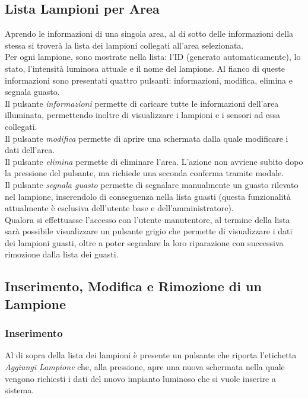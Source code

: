 \documentclass[a4paper, 12pt]{article}
\begin{document}
\subsection{Lista Lampioni per Area}
Aprendo le informazioni di una singola area, al di sotto delle informazioni della stessa si troverà la lista dei lampioni collegati all'area selezionata.\\
Per ogni lampione, sono mostrate nella lista: l'ID (generato automaticamente), lo stato, l'intensità luminosa attuale e il nome del lampione. Al fianco di queste informazioni sono presentati quattro pulsanti: informazioni, modifica, elimina e segnala guasto. \\
Il pulsante \textit{informazioni} permette di caricare tutte le informazioni dell'area illuminata, permettendo inoltre di visualizzare i lampioni e i sensori ad essa collegati.\\
Il pulsante \textit{modifica} permette di aprire una schermata dalla quale modificare i dati dell'area.\\
Il pulsante \textit{elimina} permette di eliminare l'area. L'azione non avviene subito dopo la pressione del pulsante, ma richiede una seconda conferma tramite modale. \\
Il pulsante \textit{segnala guasto} permette di segnalare manualmente un guasto rilevato nel lampione, inserendolo di conseguenza nella lista guasti (questa funzionalità attualmente è esclusiva dell'utente base e dell'amministratore).\\
Qualora si effettuasse l'accesso con l'utente manutentore, al termine della lista sarà possibile visualizzare un pulsante grigio che permette di visualizzare i dati dei lampioni guasti, oltre a poter segnalare la loro riparazione con successiva rimozione dalla lista dei guasti.

\subsection{Inserimento, Modifica e Rimozione di un Lampione}
\subsubsection{Inserimento}
Al di sopra della lista dei lampioni è presente un pulsante che riporta l'etichetta \textit{Aggiungi Lampione} che, alla pressione, apre una nuova schermata nella quale vengono richiesti i dati del nuovo impianto luminoso che si vuole inserire a sistema.
\end{document}
